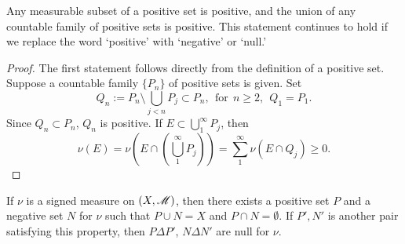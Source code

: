 \documentclass[12pt]{article} %
\begin{document}
\begin{lemma}
    Any measurable subset of a positive set is positive, and the union of any countable family of positive sets is positive. This statement continues to hold if we replace the word `positive' with `negative' or `null.'
\end{lemma}

\begin{proof}
    The first statement follows directly from the definition of a positive set. Suppose a countable family $\{P_n\}$ of positive sets is given. Set \[Q_n := P_n \setminus \bigcup_{j < n} P_j \subset P_n, \ \ \text{for} \ \ n \geq 2, \ \  Q_1 = P_1.\] Since $Q_n \subset P_n$, $Q_n$ is positive. If $E \subset \bigcup_1^\infty P_j$, then \[\nu(E) = \nu\left(E \cap \left(\bigcup_1^\infty P_j\right)\right) = \sum_1^\infty \nu(E \cap Q_j) \geq 0.\]
\end{proof}

\begin{lemma}\label{lem:hahn}
    If $\nu$ is a signed measure on $(X, \mathscr{M})$, then there exists a positive set $P$ and a negative set $N$ for $\nu$ such that $P \cup N = X$ and $P \cap N = \emptyset$. If $P', N'$ is another pair satisfying this property, then $P \Delta P'$, $N \Delta N'$ are null for $\nu$.
\end{lemma}
\end{document}
